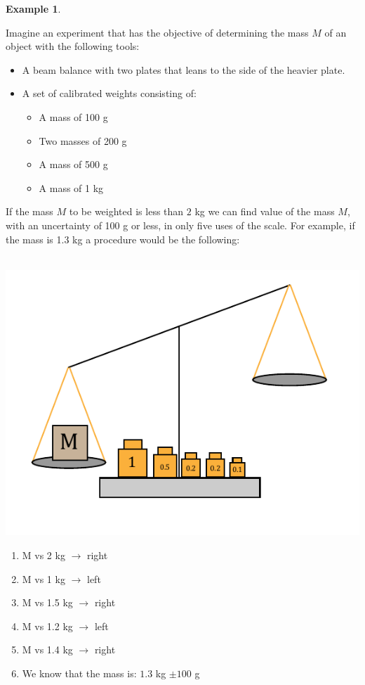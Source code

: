 \documentclass[11pt,a4paper,twoside]{report}
\newcommand{\+}{\textnormal{+} }
\theoremstyle{definition}
\newtheorem{myex}[mythm]{Example}
\numberwithin{equation}{chapter}
\begin{document}
\begin{myex} \label{scalex}
  
  Imagine an experiment that has the objective of determining the mass $M$ of an
  object with the following tools:
  
  \begin{itemize}
    \item A beam balance with two plates that leans to the side of the heavier
    plate. 
    \item A set of calibrated weights consisting of:
    \begin{itemize}
      \item A mass of 100 g
      \item Two masses of 200 g
      \item A mass of 500 g
      \item A mass of 1 kg
    \end{itemize}  
  \end{itemize}

If the mass $M$ to be weighted is less than $2$ kg we can find value of the mass
$M$, with an uncertainty of 100 g or less, in only five uses of the scale. For
example, if the mass is 1.3 kg a procedure would be the following:
\\\\
\begin{minipage}[]{0.5\linewidth}
  \centering
  \strut\vspace*{-\baselineskip}\newline\includegraphics[width=0.8\linewidth]{figures/scale.pdf}
\end{minipage}
\begin{minipage}[]{0.4\linewidth}
  \begin{enumerate}
  \item M vs 2 kg $\rightarrow$ right
  \item M vs 1 kg $\rightarrow$ left
  \item  M vs 1.5 kg $\rightarrow$ right
  \item  M vs 1.2 kg $\rightarrow$ left
  \item  M vs 1.4 kg $\rightarrow$ right
  \item  We know that the mass is: $1.3$ kg $\pm 100$ g
\end{enumerate}
\end{minipage}
\\\\


\end{myex}
\end{document}

